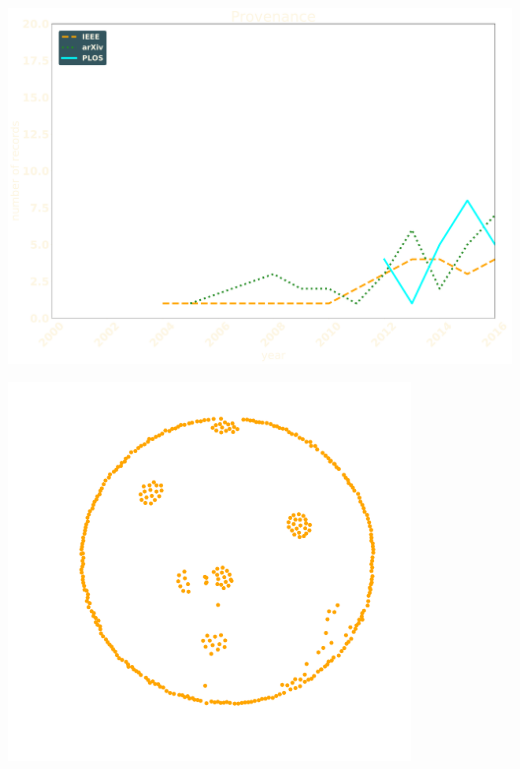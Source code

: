 \documentclass{beamer}
\begin{document}
\begin{frame}
\begin{center}
    \includegraphics[width=\textwidth]{static/provenance.pdf}
\end{center}
\end{frame}

\begin{frame}
\begin{center}
    \includegraphics[width=0.8\textwidth]{static/network.pdf}
\end{center}
\end{frame}
\end{document}
